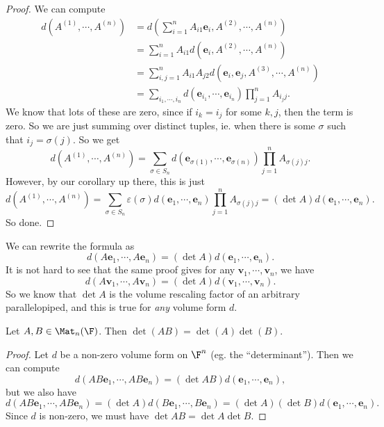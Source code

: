 \documentclass[a4paper]{article}
\begin{document}
\begin{proof}
  We can compute
  \begin{align*}
    d(A^{(1)}, \cdots, A^{(n)}) &= d\left(\sum_{i = 1}^n A_{i1} \mathbf{e}_i, A^{(2)}, \cdots, A^{(n)}\right)\\
    &= \sum_{i = 1}^n A_{i1} d(\mathbf{e}_i, A^{(2)}, \cdots, A^{(n)})\\
    &= \sum_{i, j = 1}^n A_{i1}A_{j2}d(\mathbf{e}_i, \mathbf{e}_j, A^{(3)}, \cdots, A^{(n)})\\
    &= \sum_{i_1, \cdots, i_n} d(\mathbf{e}_{i_1}, \cdots, \mathbf{e}_{i_n})\prod_{j = 1}^n A_{i_j j}.
  \end{align*}
  We know that lots of these are zero, since if $i_k = i_j$ for some $k, j$, then the term is zero. So we are just summing over distinct tuples, ie. when there is some $\sigma$ such that $i_j = \sigma(j)$. So we get
  \[
    d(A^{(1)}, \cdots, A^{(n)}) = \sum_{\sigma \in S_n} d(\mathbf{e}_{\sigma(1)}, \cdots, \mathbf{e}_{\sigma(n)})\prod_{j = 1}^n A_{\sigma(j)j}.
  \]
  However, by our corollary up there, this is just
  \[
    d(A^{(1)}, \cdots, A^{(n)}) = \sum_{\sigma \in S_n} \varepsilon(\sigma) d(\mathbf{e}_1, \cdots, \mathbf{e}_n) \prod_{j = 1}^n A_{\sigma(j)j} = (\det A) d(\mathbf{e}_1, \cdots, \mathbf{e}_n).
  \]
  So done.
\end{proof}
We can rewrite the formula as
\[
  d (A \mathbf{e}_1, \cdots, A\mathbf{e}_n) = (\det A)d(\mathbf{e}_1, \cdots, \mathbf{e}_n).
\]
It is not hard to see that the same proof gives for any $\mathbf{v}_1, \cdots, \mathbf{v}_n$, we have
\[
  d(A\mathbf{v}_1, \cdots, A\mathbf{v}_n) = (\det A)d(\mathbf{v}_1, \cdots, \mathbf{v}_n).
\]
So we know that $\det A$ is the volume rescaling factor of an arbitrary parallelopiped, and this is true for \emph{any} volume form $d$.

\begin{thm}
  Let $A, B \in \Mat_n(\F)$. Then $\det(AB) = \det(A)\det(B)$.
\end{thm}

\begin{proof}
  Let $d$ be a non-zero volume form on $\F^n$ (eg. the ``determinant''). Then we can compute
  \[
    d(AB\mathbf{e}_1,\cdots , AB\mathbf{e}_n) = (\det AB) d(\mathbf{e}_1,\cdots, \mathbf{e}_n),
  \]
  but we also have
  \[
    d(AB\mathbf{e}_1, \cdots, AB\mathbf{e}_n) = (\det A) d(B\mathbf{e}_1, \cdots, B\mathbf{e}_n) = (\det A)(\det B)d(\mathbf{e}_1, \cdots, \mathbf{e}_n).
  \]
  Since $d$ is non-zero, we must have $\det AB = \det A \det B$.
\end{proof}
\end{document}
